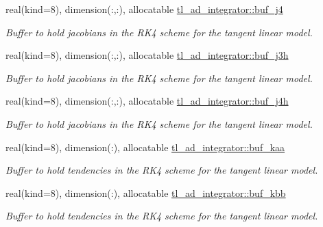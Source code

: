 \begin{DoxyCompactItemize}
real(kind=8), dimension(\+:,\+:), allocatable \hyperlink{namespacetl__ad__integrator_a853bee458e7337f1556f19370dcbc9d6}{tl\+\_\+ad\+\_\+integrator\+::buf\+\_\+j4}
\begin{DoxyCompactList}\small\item\em Buffer to hold jacobians in the R\+K4 scheme for the tangent linear model. \end{DoxyCompactList}\item 
real(kind=8), dimension(\+:,\+:), allocatable \hyperlink{namespacetl__ad__integrator_a9ead2c02f871be0e94e91278fa71337c}{tl\+\_\+ad\+\_\+integrator\+::buf\+\_\+j3h}
\begin{DoxyCompactList}\small\item\em Buffer to hold jacobians in the R\+K4 scheme for the tangent linear model. \end{DoxyCompactList}\item 
real(kind=8), dimension(\+:,\+:), allocatable \hyperlink{namespacetl__ad__integrator_a99c2747c1997b622f4ab6170e3a8f23d}{tl\+\_\+ad\+\_\+integrator\+::buf\+\_\+j4h}
\begin{DoxyCompactList}\small\item\em Buffer to hold jacobians in the R\+K4 scheme for the tangent linear model. \end{DoxyCompactList}\item 
real(kind=8), dimension(\+:), allocatable \hyperlink{namespacetl__ad__integrator_a24b147c589eb6bdb6175c56657aff5ae}{tl\+\_\+ad\+\_\+integrator\+::buf\+\_\+kaa}
\begin{DoxyCompactList}\small\item\em Buffer to hold tendencies in the R\+K4 scheme for the tangent linear model. \end{DoxyCompactList}\item 
real(kind=8), dimension(\+:), allocatable \hyperlink{namespacetl__ad__integrator_a68ad95731421a7e0c9f37668631e279c}{tl\+\_\+ad\+\_\+integrator\+::buf\+\_\+kbb}
\begin{DoxyCompactList}\small\item\em Buffer to hold tendencies in the R\+K4 scheme for the tangent linear model. \end{DoxyCompactList}\end{DoxyCompactItemize}
